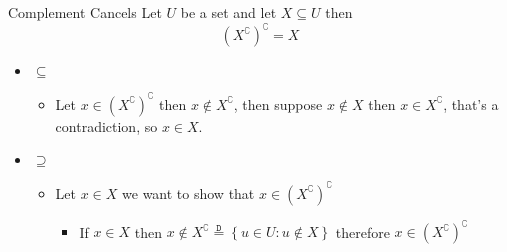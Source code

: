 \documentclass{standalone}
\begin{document}
\begin{theo*}{Complement Cancels}
Let $U$ be a set and let $X \subseteq U$ then 
\[
(X^{\complement})^{\complement} = X
\]

\begin{pf}
  \begin{itemize}
    \item $\subseteq$
    \begin{itemize}
    \item Let $x \in (X^{\complement})^{\complement}$ then $x \not\in X^{\complement}$, then suppose $x \not\in X$ then $x \in X^{\complement}$, that's a contradiction, so $x \in X$. 
    \end{itemize}
    \item $\supseteq$
      \begin{itemize}
        \item Let $x \in X$ we want to show that $x \in (X^{\complement})^{\complement}$ 
        \begin{itemize}
          \item If $x \in X$ then $x \not\in X^{\complement} \stackrel{\mathtt{D}}{=} \left\{ u \in U: u \not\in X \right\}$ therefore $x \in (X^{\complement})^{\complement}$
        \end{itemize}
      \end{itemize}
  \end{itemize}
  
\end{pf}
\end{theo*}
\end{document}
